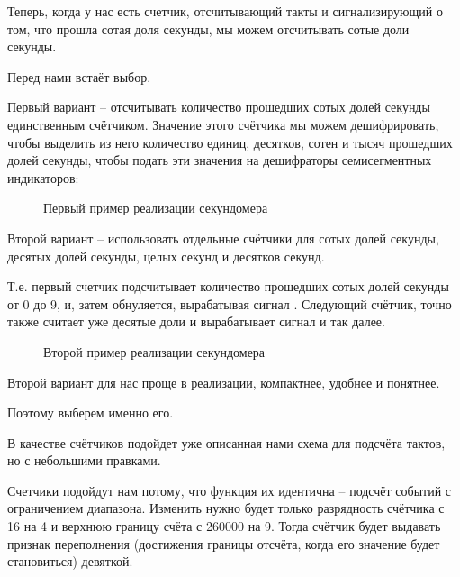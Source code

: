 

\par{Теперь, когда у нас есть счетчик, отсчитывающий такты и сигнализирующий о том, что прошла сотая доля секунды, мы можем отсчитывать сотые доли секунды.}

\par{Перед нами встаёт выбор.}

\par{Первый вариант – отсчитывать количество прошедших сотых долей секунды единственным счётчиком. Значение этого счётчика мы можем дешифрировать, чтобы выделить из него количество единиц, десятков, сотен и тысяч прошедших долей секунды, чтобы подать эти значения на дешифраторы семисегментных индикаторов:}

\begin{figure}[H]
	\centering
	\def\svgwidth{\columnwidth}
	
	\caption{Первый пример реализации секундомера}
\end{figure}

\par{Второй вариант – использовать отдельные счётчики для сотых долей секунды, десятых долей секунды, целых секунд и десятков секунд.}

\par{Т.е. первый счетчик подсчитывает количество прошедших сотых долей секунды от 0 до 9, и, затем обнуляется, вырабатывая сигнал . Следующий счётчик, точно также считает уже десятые доли и вырабатывает сигнал  и так далее.}

\begin{figure}[H]
	\centering
	\def\svgwidth{\columnwidth}
	
	\caption{Второй пример реализации секундомера}
\end{figure}

\par{Второй вариант для нас проще в реализации, компактнее, удобнее и понятнее.}

\par{Поэтому выберем именно его.}

\par{В качестве счётчиков подойдет уже описанная нами схема для подсчёта тактов, но с небольшими правками.}

\par{Счетчики подойдут нам потому, что функция их идентична – подсчёт событий с ограничением диапазона. Изменить нужно будет только разрядность счётчика с 16 на 4 и верхнюю границу счёта с 260000 на 9. Тогда счётчик будет выдавать признак переполнения (достижения границы отсчёта, когда его значение будет становиться) девяткой.}

